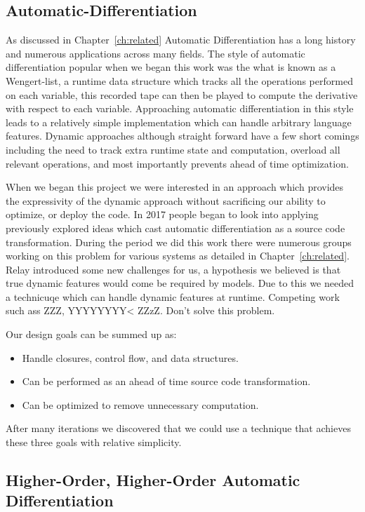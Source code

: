 \subsection{Automatic-Differentiation}

As discussed in Chapter~\ref{ch:related} Automatic Differentiation has a long history
  and numerous applications across many fields.
The style of automatic differentiation popular when we began this work was the
  what is known as a Wengert-list, a runtime data structure which tracks
  all the operations performed on each variable, this recorded tape can then
  be played to compute the derivative with respect to each variable.
Approaching automatic differentiation in this style leads to a relatively simple
  implementation which can handle arbitrary language features.
Dynamic approaches although straight forward have a few short comings
  including the need to track extra runtime state and computation,
  overload all relevant operations, and most importantly prevents
  ahead of time optimization.

When we began this project we were interested in an approach which
  provides the expressivity of the dynamic approach without
  sacrificing our ability to optimize, or deploy the code.
In 2017 people began to look into applying previously explored
  ideas which cast automatic differentiation as a source code
  transformation.
During the period we did this work there were numerous
  groups working on this problem for various systems
  as detailed in Chapter~\ref{ch:related}.
Relay introduced some new challenges for us, a hypothesis we
  believed is that true dynamic features would come be required
  by models.
Due to this we needed a technicuqe which can handle dynamic
  features at runtime.
Competing work such ass ZZZ, YYYYYYYY< ZZzZ.
Don't solve this problem.

Our design goals can be summed up as:
\begin{itemize}
  \item Handle closures, control flow, and data structures.
  \item Can be performed as an ahead of time source code
    transformation.
  \item Can be optimized to remove unnecessary computation.
\end{itemize}

After many iterations we discovered that we could use a
  technique that achieves these three goals with relative
  simplicity.

\subsection{Higher-Order, Higher-Order Automatic Differentiation}
\label{sec:autodiff}

